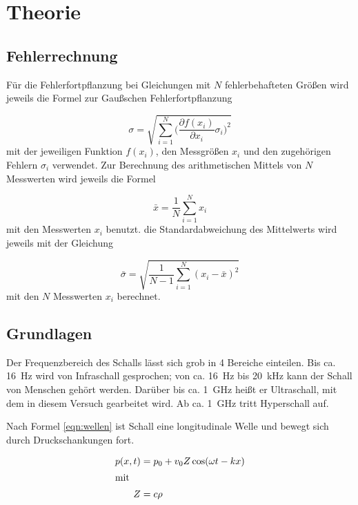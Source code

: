 \section{Theorie}
\label{sec:Theorie}

\subsection{Fehlerrechnung}

Für die Fehlerfortpflanzung bei Gleichungen mit $N$ fehlerbehafteten Größen
wird jeweils die Formel zur Gaußschen Fehlerfortpflanzung

\begin{equation}
  \sigma = \sqrt{\sum_{i=1}^{N}\biggl(\frac{\partial f(x_i)}{\partial x_i}
  \sigma_i\biggr)^2}
\end{equation}
mit der jeweiligen Funktion $f(x_i)$, den Messgrößen $x_i$ und den
zugehörigen Fehlern $\sigma_i$ verwendet.
Zur Berechnung des arithmetischen Mittels von $N$ Messwerten wird jeweils die
Formel

\begin{equation}
  \bar{x} = \frac{1}{N}\sum_{i=1}^{N}x_i
\end{equation}
mit den Messwerten $x_i$ benutzt.
die Standardabweichung des Mittelwerts wird jeweils mit der Gleichung

\begin{equation}
  \bar{\sigma} = \sqrt{\frac{1}{N-1}\sum_{i=1}^{N}(x_i - \bar{x})^2}
\end{equation}
mit den $N$ Messwerten $x_i$ berechnet.

\subsection{Grundlagen}

Der Frequenzbereich des Schalls lässt sich grob in 4 Bereiche einteilen.
Bis ca. \SI{16}{\hertz} wird von Infraschall gesprochen; von ca. \SI{16}{\hertz} bis \SI{20}{\kilo\hertz}
kann der Schall von Menschen gehört werden. Darüber bis ca. \SI{1}{\giga\hertz}
heißt er Ultraschall, mit dem in diesem Versuch gearbeitet wird. Ab ca. \SI{1}{\giga\hertz}
tritt Hyperschall auf.

Nach Formel \eqref{eqn:wellen} ist Schall eine longitudinale Welle und bewegt sich
durch Druckschankungen fort.

\begin{align}
  p(x, t) &= p_0 + v_0 Z \cos(\omega t - k x)\\\label{eqn:wellen}
  \intertext{mit}
  Z &= c \rho \label{eqn:impedanz}
\end{align}

